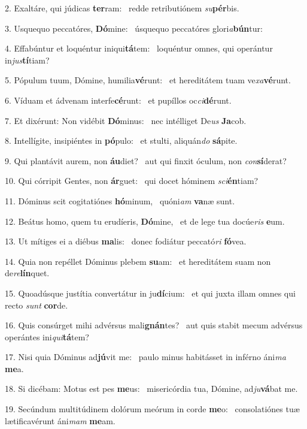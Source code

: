 2. Exaltáre, qui júdicas \textbf{ter}ram: \ast\  redde retributiónem \textit{su}\textbf{pér}bis.\

3. Usquequo peccatóres, \textbf{Dó}mine: \ast\  úsquequo peccatóres glori\textit{a}\textbf{bún}tur:\

4. Effabúntur et loquéntur iniqui\textbf{tá}tem: \ast\  loquéntur omnes, qui operántur in\textit{jus}\textbf{tí}tiam?\

5. Pópulum tuum, Dómine, humilia\textbf{vé}runt: \ast\  et hereditátem tuam ve\textit{xa}\textbf{vé}runt.\

6. Víduam et ádvenam interfe\textbf{cé}runt: \ast\  et pupíllos oc\textit{ci}\textbf{dé}runt.\

7. Et dixérunt: Non vidébit \textbf{Dó}minus: \ast\  nec intélliget De\textit{us} \textbf{Ja}cob.\

8. Intellígite, insipiéntes in \textbf{pó}pulo: \ast\  et stulti, aliquán\textit{do} \textbf{sá}pite.\

9. Qui plantávit aurem, non \textbf{áu}diet? \ast\  aut qui finxit óculum, non \textit{con}\textbf{sí}derat?\

10. Qui córripit Gentes, non \textbf{ár}guet: \ast\  qui docet hóminem \textit{sci}\textbf{én}tiam?\

11. Dóminus scit cogitatiónes \textbf{hó}minum, \ast\  quóni\textit{am} \textbf{va}næ sunt.\

12. Beátus homo, quem tu erudíeris, \textbf{Dó}mine, \ast\  et de lege tua docúe\textit{ris} \textbf{e}um.\

13. Ut mítiges ei a diébus \textbf{ma}lis: \ast\  donec fodiátur peccató\textit{ri} \textbf{fó}vea.\

14. Quia non repéllet Dóminus plebem \textbf{su}am: \ast\  et hereditátem suam non de\textit{re}\textbf{lín}quet.\

15. Quoadúsque justítia convertátur in ju\textbf{dí}cium: \ast\  et qui juxta illam omnes qui recto \textit{sunt} \textbf{cor}de.\

16. Quis consúrget mihi advérsus mali\textbf{gnán}tes? \ast\  aut quis stabit mecum advérsus operántes ini\textit{qui}\textbf{tá}tem?\

17. Nisi quia Dóminus ad\textbf{jú}vit me: \ast\  paulo minus habitásset in inférno áni\textit{ma} \textbf{me}a.\

18. Si dicébam: Motus est pes \textbf{me}us: \ast\  misericórdia tua, Dómine, ad\textit{ju}\textbf{vá}bat me.\

19. Secúndum multitúdinem dolórum meórum in corde \textbf{me}o: \ast\  consolatiónes tuæ lætificavérunt áni\textit{mam} \textbf{me}am.\

